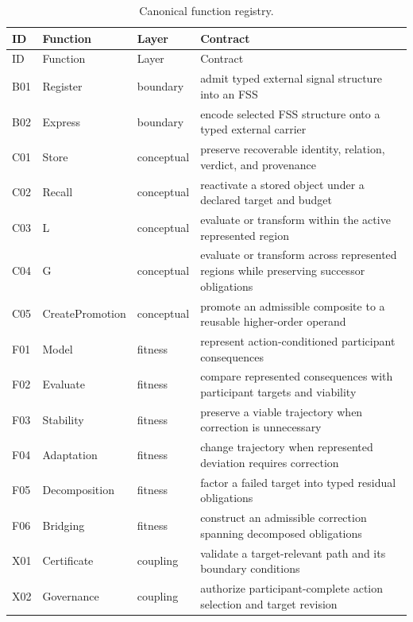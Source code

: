 \begin{longtable}{p{}p{}p{}p{}}
\caption{Canonical function registry.}\label{tab:registry}\\
\toprule ID & Function & Layer & Contract \\ \midrule \endfirsthead
\toprule ID & Function & Layer & Contract \\ \midrule \endhead
B01 & Register & boundary & admit typed external signal structure into an FSS \\
B02 & Express & boundary & encode selected FSS structure onto a typed external carrier \\
C01 & Store & conceptual & preserve recoverable identity, relation, verdict, and provenance \\
C02 & Recall & conceptual & reactivate a stored object under a declared target and budget \\
C03 & L & conceptual & evaluate or transform within the active represented region \\
C04 & G & conceptual & evaluate or transform across represented regions while preserving successor obligations \\
C05 & CreatePromotion & conceptual & promote an admissible composite to a reusable higher-order operand \\
F01 & Model & fitness & represent action-conditioned participant consequences \\
F02 & Evaluate & fitness & compare represented consequences with participant targets and viability \\
F03 & Stability & fitness & preserve a viable trajectory when correction is unnecessary \\
F04 & Adaptation & fitness & change trajectory when represented deviation requires correction \\
F05 & Decomposition & fitness & factor a failed target into typed residual obligations \\
F06 & Bridging & fitness & construct an admissible correction spanning decomposed obligations \\
X01 & Certificate & coupling & validate a target-relevant path and its boundary conditions \\
X02 & Governance & coupling & authorize participant-complete action selection and target revision \\
\bottomrule
\end{longtable}

